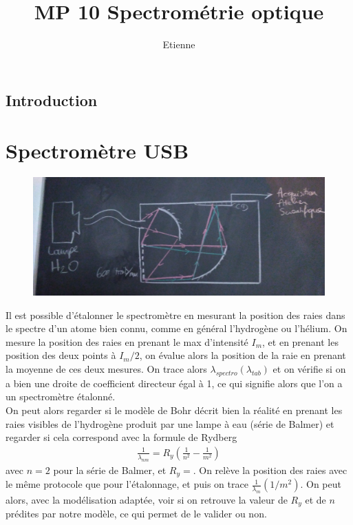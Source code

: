 \documentclass[12pt,prb,aps,epsf]{report}
\begin{document}
	
	\title{MP 10 Spectrométrie optique}
	\author{Etienne}
	
	\maketitle
	
	\tableofcontents
	
	\pagebreak
	
\subsection{Introduction}

\section{Spectromètre USB}

\begin{figure}
	\centerline{\includegraphics[width=12cm]{spectro}}
\end{figure}

Il est possible d'étalonner le spectromètre en mesurant la position des raies dans le spectre d'un atome bien connu, comme en général l'hydrogène ou l'hélium. On mesure la position des raies en prenant le max d'intensité $I_m$, et en prenant les position des deux points à $I_m/2$, on évalue alors la position de la raie en prenant la moyenne de ces deux mesures.  On trace alors $\lambda_{spectro}(\lambda_{tab})$ et on vérifie si on a bien une droite de coefficient directeur égal à 1, ce qui signifie alors que l'on a un spectromètre étalonné.\\

On peut alors regarder si le modèle de Bohr décrit bien la réalité en prenant les raies visibles de l'hydrogène produit par une lampe à eau (série de Balmer) et regarder si cela correspond avec la formule de Rydberg 
\begin{eqnarray}
\frac{1}{\lambda_{nm}} = R_y\left(\frac{1}{n^2}-\frac{1}{m^2}\right)
\end{eqnarray}
avec $n=2$ pour la série de Balmer, et $R_y = $. On relève la position des raies avec le même protocole que pour l'étalonnage, et puis on trace $\frac{1}{\lambda_m}(1/m^2)$. On peut alors, avec la modélisation adaptée, voir si on retrouve la valeur de $R_y$ et de $n$ prédites par notre modèle, ce qui permet de le valider ou non.\\
\end{document}
